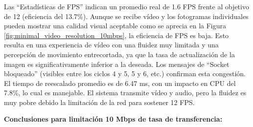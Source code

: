 Las ``Estadísticas de FPS'' indican un promedio real de 1.6 FPS frente al objetivo de 12 (eficiencia del 13.7\%). Aunque se recibe vídeo y los fotogramas individuales pueden mostrar una calidad visual aceptable como se aprecia en la Figura \ref{fig:minimal_video_resolution_10mbps}, la eficiencia de FPS es baja. Esto resulta en una experiencia de vídeo con una fluidez muy limitada y una percepción de movimiento entrecortada, ya que la tasa de actualización de la imagen es significativamente inferior a la deseada.  Los mensajes de ``Socket bloqueado'' (visibles entre los ciclos 4 y 5, 5 y 6, etc.) confirman esta congestión. El tiempo de reescalado promedio es de 6.47 ms, con un impacto en CPU del 7.8\%, lo cual es manejable. El sistema transmite vídeo y audio, pero la fluidez es muy pobre debido la limitación de la red para sostener 12 FPS.
\vspace{\baselineskip}

\textbf{Conclusiones para limitación 10 Mbps de tasa de transferencia:}

